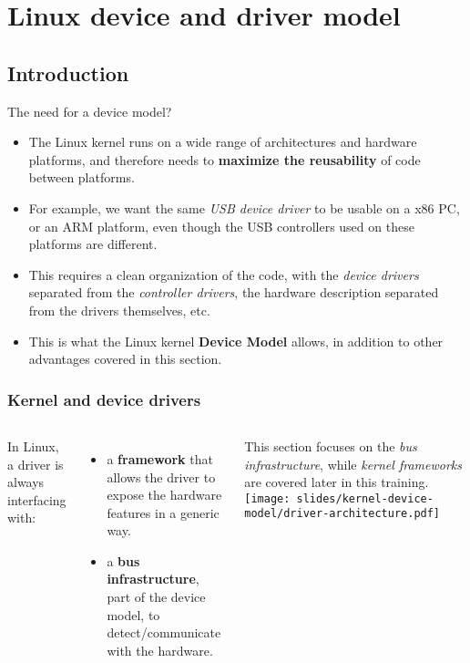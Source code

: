 \section{Linux device and driver model}

\subsection{Introduction}

\begin{frame}{The need for a device model?}
  \begin{itemize}
  \item The Linux kernel runs on a wide range of architectures and
    hardware platforms, and therefore needs to {\bf maximize the
      reusability} of code between platforms.
  \item For example, we want the same {\em USB device driver} to be
    usable on a x86 PC, or an ARM platform, even though the USB
    controllers used on these platforms are different.
  \item This requires a clean organization of the code, with the {\em
      device drivers} separated from the {\em controller drivers}, the
    hardware description separated from the drivers themselves, etc.
  \item This is what the Linux kernel {\bf Device Model} allows, in
    addition to other advantages covered in this section.
  \end{itemize}
\end{frame}

\begin{frame}
  \frametitle{Kernel and device drivers}
  \begin{columns}
     In Linux, a driver is always interfacing
    with:
    \begin{itemize}
    \item a {\bf framework} that allows the driver to expose the
      hardware features in a generic way.
    \item a {\bf bus infrastructure}, part of the device model, to
      detect/communicate with the hardware.
    \end{itemize}
    This section focuses on the {\em bus infrastructure}, while {\em kernel
      frameworks} are covered later in this training.
    \texttt{[image: slides/kernel-device-model/driver-architecture.pdf]}
  \end{columns}
\end{frame}

